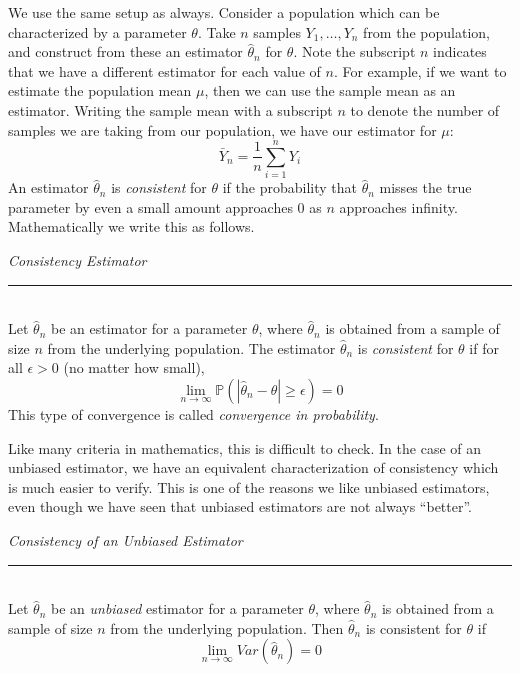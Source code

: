 \documentclass[12pt]{article}
\theoremstyle{definition}
\theoremstyle{remark}
\def\P{{\mathbb P}}
\begin{document}
We use the same setup as always. Consider a population which can be characterized by a parameter $\theta$. Take $n$ samples $Y_1, \dots, Y_n$ from the population, and construct from these an estimator $\hat{\theta}_n$ for $\theta$. Note the subscript $n$ indicates that we have a different estimator for each value of $n$. For example, if we want to estimate the population mean $\mu$, then we can use the sample mean as an estimator. Writing the sample mean with a subscript $n$ to denote the number of samples we are taking from our population, we have our estimator for $\mu$:
\[
\bar{Y}_n = \frac{1}{n} \sum_{i=1}^n Y_i
\]
An estimator $\hat{\theta}_n$ is \emph{consistent} for $\theta$ if the probability that $\hat{\theta}_n$ misses the true parameter by even a small amount approaches 0 as $n$ approaches infinity. Mathematically we write this as follows.

\begin{framed}
\emph{Consistency Estimator}\\
  \rule{\dimexpr{}\fboxrule}{.1pt} \\
Let $\hat{\theta}_n$ be an estimator for a parameter $\theta$, where $\hat{\theta}_n$ is obtained from a sample of size $n$ from the underlying population. The estimator $\hat{\theta}_n$ is \emph{consistent} for $\theta$ if for all $\epsilon > 0$ (no matter how small),
\[
\lim_{n\rightarrow\infty} \P(|\hat{\theta}_n - \theta| \geq \epsilon ) = 0
\]
This type of convergence is called \emph{convergence in probability}.
\end{framed}

Like many criteria in mathematics, this is difficult to check. In the case of an unbiased estimator, we have an equivalent characterization of consistency which is much easier to verify. This is one of the reasons we like unbiased estimators, even though we have seen that unbiased estimators are not always ``better''.

\begin{framed}
\emph{Consistency of an Unbiased Estimator}\\
  \rule{\dimexpr{}\fboxrule}{.1pt} \\
Let $\hat{\theta}_n$ be an \emph{unbiased} estimator for a parameter $\theta$, where $\hat{\theta}_n$ is obtained from a sample of size $n$ from the underlying population. Then $\hat{\theta}_n$ is consistent for $\theta$ if
\[
\lim_{n\rightarrow\infty} Var(\hat{\theta}_n) = 0
\]
\end{framed}
\end{document}
